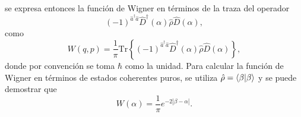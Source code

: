 se expresa entonces la función de Wigner en términos de la traza del operador \cite{Moya}
\begin{equation}
  (-1)^{\hat{a}^\dagger\hat{a}} \hat{D}^{\dagger}(\alpha) \hat{\rho} \hat{D}(\alpha),
\end{equation}
como
\begin{equation}\label{eq:c4-moya}
  W(q,p) = \frac{1}{\pi} \text{Tr}{\left\{ (-1)^{\hat{a}^\dagger\hat{a}} \hat{D}^{\dagger}(\alpha) \hat{\rho} \hat{D}(\alpha) \right\}},
\end{equation}
donde por convención se toma $\hbar$ como la unidad. Para calcular la función de Wigner en términos de estados coherentes puros, se utiliza $\hat{\rho} = \bra{\beta}\ket{\beta}$ y se puede demostrar que \cite{sanchez}
\begin{equation*}
  W(\alpha) = \frac{1}{\pi}e^{-2|\beta-\alpha|}.
\end{equation*}